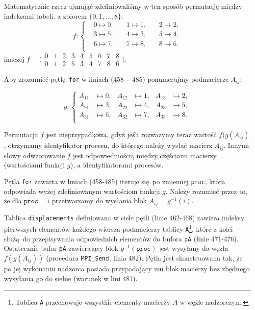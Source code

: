 Matematycznie rzecz ujmująć zdefiniowaliśmy w ten sposób permutację między indeksami tabeli, a zbiorem \(\{0, 1, \dots, 8\}\):
\begin{equation*}
f\colon \left\{\begin{aligned}
& 0\mapsto 0, & \quad 1\mapsto 1, & \quad 2\mapsto 2, \\
& 3\mapsto 5, & \quad 4\mapsto 3, & \quad 5\mapsto 4, \\
& 6\mapsto 7, & \quad 7\mapsto 8, & \quad 8\mapsto 6. \\
\end{aligned}\right.
\end{equation*}
inaczej \(f=\bigl(\begin{smallmatrix}
  0 & 1 & 2 & 3 & 4 & 5 & 6 & 7 & 8\\
  0 & 1 & 2 & 5 & 3 & 4 & 7 & 8 & 6
\end{smallmatrix}\bigr)\).

\noindent Aby zrozumieć pętlę \texttt{for} w liniach (\(458-485\)) 
ponumerujmy podmacierze \(A_{ij}\):

\begin{equation*}
g\colon \left\{\begin{aligned}
A_{11}&\mapsto 0, & A_{12}&\mapsto 1, & A_{13}&\mapsto 2, \\
A_{21}&\mapsto 3, & A_{22}&\mapsto 4, & A_{23}&\mapsto 5, \\
A_{31}&\mapsto 6, & A_{32}&\mapsto 7, & A_{33}&\mapsto 8. \\
\end{aligned}\right.
\end{equation*}


Permutacja \(f\) jest nieprzypadkowa, gdyż jeśli rozważymy teraz wartość \(f(g(A_{ij})\), otrzymamy identyfikator procesu, do którego należy wysłać macierz \(A_{ij}\). Innymi słowy odwzorowanie \(f\) jest odpowiedniością między częściami macierzy (wartościami funkcji \(g\)), a identyfikatorami procesów.

Pętla \texttt{for} zawarta w liniach (458-485) iteruje się po zmiennej \texttt{proc}, która odpowiada wyżej zdefiniowanym wartościom funkcji \(g\). Należy rozumieć przez to, że dla \(\mathtt{proc}=i\) przetwarzamy do wysłania blok \(A_{ij}=g^{-1}(i)\).


Tablica \texttt{displacements} definiowana w ciele pętli (linie 462-468) zawiera indeksy pierwszych elementów każdego wiersza podmacierzy tablicy \texttt{A}\footnote{Tablica \texttt{A} przechowuje wszystkie elementy macierzy \(A\) w węźle nadzorczym.}, które z kolei służą do przepisywania odpowiednich elementów do bufora \texttt{pA} (linie 471-476). Ostatecznie bufor \texttt{pA} zawierający blok \(g^{-1}(\mathtt{proc})\) jest wysyłany do węzła \(f(g(A_{ij}))\) (procedura \texttt{MPI\_Send}, linia 482). Pętla jest skonstruowana tak, że po jej wykonaniu nadzorca posiada przypadający mu blok macierzy bez zbędnego wysyłania go do siebie (warunek w lini 481). 


